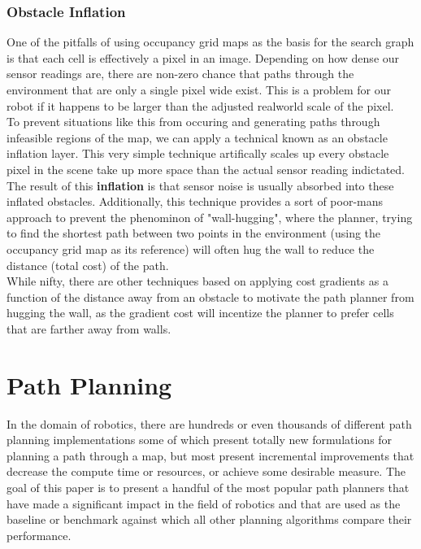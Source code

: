 \documentclass[journal]{IEEEtran}
\begin{document}
\subsubsection{Obstacle Inflation}

One of the pitfalls of using occupancy grid maps as the basis for the search graph is that each cell is effectively a pixel in an image. Depending on how dense our sensor readings are, there are non-zero chance that paths through the environment that are only a single pixel wide exist. This is a problem for our robot if it happens to be larger than the adjusted realworld scale of the pixel. \\

To prevent situations like this from occuring and generating paths through infeasible regions of the map, we can apply a technical known as an obstacle inflation layer. This very simple technique artifically scales up every obstacle pixel in the scene take up more space than the actual sensor reading indictated. The result of this \textbf{inflation} is that sensor noise is usually absorbed into these inflated obstacles. Additionally, this technique provides a sort of poor-mans approach to prevent the phenominon of "wall-hugging", where the planner, trying to find the shortest path between two points in the environment (using the occupancy grid map as its reference) will often hug the wall to reduce the distance (total cost) of the path.\\

While nifty, there are other techniques based on applying cost gradients as a function of the distance away from an obstacle to motivate the path planner from hugging the wall, as the gradient cost will incentize the planner to prefer cells that are farther away from walls. 



\section{Path Planning}

In the domain of robotics, there are hundreds or even thousands of different path planning implementations some of which present totally new formulations for planning a path through a map, but most present incremental improvements that decrease the compute time or resources, or achieve some desirable measure. The goal of this paper is to present a handful of the most popular path planners that have made a significant impact in the field of robotics and that are used as the baseline or benchmark against which all other planning algorithms compare their performance. \\
\end{document}
